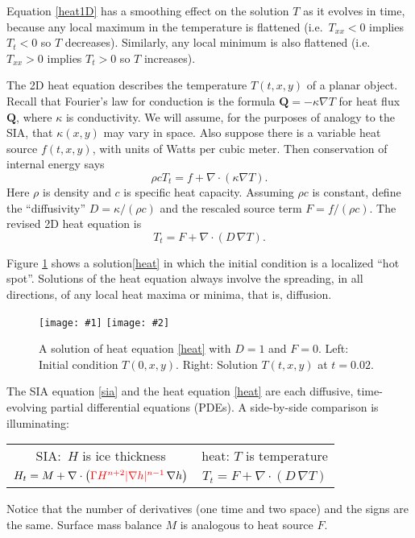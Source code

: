 \documentclass[letterpaper,final,12pt,reqno]{amsart}
\newcommand{\grad}{\nabla}
\newcommand{\Div}{\nabla\cdot}
\newcommand{\twofigsizes}[5]{
\begin{figure}[ht]
\centering
\texttt{[image: \#1]} \quad
\texttt{[image: \#2]}
\caption{#3}
\label{fig:#1}
\end{figure}}
\begin{document}
Equation \eqref{heat1D} has a smoothing effect on the solution $T$ as it evolves in time, because any local maximum in the temperature is flattened (i.e.~$T_{xx}<0$ implies $T_t<0$ so $T$ decreases).  Similarly, any local minimum is also flattened (i.e.~$T_{xx}>0$ implies $T_t>0$ so $T$ increases).

The 2D heat equation describes the temperature $T(t,x,y)$ of a planar object.  Recall that Fourier's law for conduction is the formula $\mathbf{Q} = - \kappa \grad T$ for heat flux $\mathbf{Q}$, where $\kappa$ is conductivity.  We will assume, for the purposes of analogy to the SIA, that $\kappa(x,y)$ may vary in space.  Also suppose there is a variable heat source $f(t,x,y)$, with units of Watts per cubic meter.  Then conservation of internal energy says
\begin{equation}
\rho c T_t = f + \Div (\kappa \grad T). \label{heatearly}
\end{equation}
Here $\rho$ is density and $c$ is specific heat capacity.  Assuming $\rho c$ is constant, define the ``diffusivity'' $D=\kappa/(\rho c)$ and the rescaled source term $F = f/(\rho c)$.  The revised 2D heat equation is
\begin{equation}
T_t = F + \Div (D\, \grad T). \label{heat}
\end{equation}

Figure \ref{fig:initialheat} shows a solution\eqref{heat} in which the initial condition is a localized ``hot spot''.  Solutions of the heat equation always involve the spreading, in all directions, of any local heat maxima or minima, that is, diffusion.

\twofigsizes{initialheat}{finalheat}{A solution of heat equation \eqref{heat} with $D=1$ and $F=0$.  Left: Initial condition $T(0,x,y)$.   Right: Solution $T(t,x,y)$ at $t=0.02$.}{2.8in}{2.8in}

The SIA equation \eqref{sia} and the heat equation \eqref{heat} are each diffusive, time-evolving partial differential equations (PDEs).  A side-by-side comparison is illuminating:
\begin{center}
\begin{tabular}{cc}
\vspace{1mm}
SIA:\, $H$ is ice thickness & \phantom{foo bar} heat: $T$ is temperature\phantom{foo bar}  \\
\vspace{1mm}
	$H_t = M + \Div \left({\color{red}\Gamma H^{n+2} |\grad h|^{n-1}}\, \grad h \right)$  &  $T_t = F + \Div (D\, \grad T)$
\end{tabular}
\end{center}
\vspace{1mm}
Notice that the number of derivatives (one time and two space) and the signs are the same.  Surface mass balance $M$ is analogous to heat source $F$.
\end{document}
